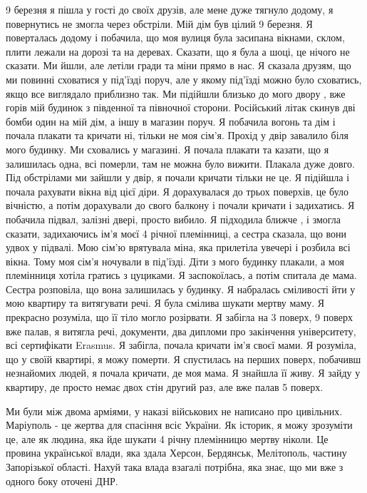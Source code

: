 9 березня я пішла у гості до своїх друзів, але мене дуже тягнуло додому, я
повернутись не змогла через обстріли. Мій дім був цілий 9 березня. Я
поверталась додому і побачила, що моя вулиця була засипана вікнами, склом,
плити лежали на дорозі та на деревах. Сказати, що я була а шоці, це нічого не
сказати. Ми йшли, але летіли гради та міни прямо в нас. Я сказала друзям, що ми
повинні сховатися у під'їзді поруч, але у якому під'їзді можно було сховатись,
якщо все виглядало приблизно так. Ми підійшли близько до мого двору , вже горів
мій будинок з південної та півночної сторони. Російський літак скинув дві бомби
один на мій дім, а іншу в магазин поруч. Я побачила вогонь та дім і почала
плакати та кричати ні, тільки не моя сім'я. Прохід у двір завалило біля мого
будинку. Ми сховались у магазині. Я почала  плакати та казати, що я залишилась
одна, всі померли, там не можна було вижити. Плакала дуже довго. Під обстрілами
ми зайшли у двір, я почали кричати тільки не це. Я  підійшла і почала рахувати
вікна від цієї діри. Я дорахувалася до трьох поверхів, це було вічністю, а
потім дорахували до свого балкону і почали кричати і задихатись. Я побачила
підвал, залізні двері, просто вибило. Я підходила ближче , і змогла сказати,
задихаючись ім'я моєї 4 річної племінниці, а сестра сказала, що вони удвох у
підвалі. Мою сім'ю врятувала міна, яка прилетіла увечері і розбила всі вікна.
Тому моя сім'я ночували в під'їзді. Діти з мого будинку плакали, а моя
племінниця хотіла гратись з цуциками. Я заспокоїлась, а потім спитала де мама.
Сестра розповіла, що вона залишилась у будинку. Я набралась сміливості йти у
мою квартиру та витягувати речі. Я була смілива шукати мертву маму. Я прекрасно
розуміла, що її тіло могло  розірвати. Я забігла на 3 поверх, 9 поверх вже
палав, я витягла речі, документи, два дипломи про закінчення університету, всі
сертифікати Erasmus. Я забігла,  почала кричати ім'я своєї мами. Я розуміла, що
у своїй квартирі, я можу померти. Я спустилась на перших поверх, побачивш
незнайомих людей, я почала кричати, де моя мама. Я знайшла її живу. Я зайду у
квартиру, де просто немає двох стін другий раз, але вже палав 5 поверх.

Ми були між двома арміями, у наказі військових не написано про цивільних.
Маріуполь - це жертва для спасіння всіє України. Як історик, я можу зрозуміти
це, але як людина, яка йде шукати 4 річну племінницю мертву ніколи. Це провина
української влади, яка здала Херсон, Бердянськ, Мелітополь, частину Запорізької
області. Нахуй така влада взагалі потрібна, яка знає, що ми вже з одного боку
оточені ДНР.
